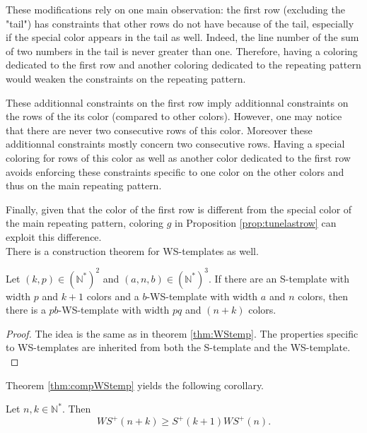 \documentclass[final,onefignum,onetabnum]{siamart190516}
\newcommand{\WS}{\mathit{WS}}
\begin{document}
\par
These modifications rely on one main observation: the first row (excluding the "tail") has constraints that other rows do not 
have because of the tail, especially if the special color appears in the tail as well. Indeed, the line number of the
sum of two numbers in the tail is never greater than one. Therefore, having a coloring dedicated to 
the first row and another coloring dedicated to the repeating pattern would weaken the constraints on the repeating pattern. 

\par
These additionnal constraints on the first row imply additionnal constraints on the rows of the its color (compared to other 
colors). However, one may notice that there are never two consecutive rows of this color. Moreover these additionnal constraints 
mostly concern two consecutive rows. Having a special coloring for rows of this color as well as another color dedicated to the 
first row avoids enforcing these constraints specific to one color on the other colors and thus on the main repeating pattern.

\par
Finally, given that the color of the first row is different from the special color of the main repeating pattern, coloring \(g\) in
Proposition \ref{prop:tunelastrow} can exploit this difference. \\

There is a construction theorem for WS-templates as well.

\begin{theorem}
\label{thm:compWStemp}
Let \((k,p) \in (\mathbb{N}^*)^2\) and \((a, n, b) \in (\mathbb{N}^*)^3\). If there are an S-template with width
\(p\) and \(k+1\) colors and a \(b\)-WS-template with width \(a\) and \(n\) colors, then there is a \(pb\)-WS-template
with width \(pq\) and \((n+k)\) colors.
\end{theorem}

\begin{proof}
The idea is the same as in theorem \ref{thm:WStemp}. The properties specific to WS-templates are inherited 
from both the S-template and the WS-template. \\
\end{proof}

Theorem \ref{thm:compWStemp} yields the following corollary.

\begin{corollary}
Let \(n, k \in \mathbb{N}^*\). Then
\[
\WS^+(n+k) \geqslant S^+(k+1) \WS^+(n).
\]
\end{corollary}
\end{document}
